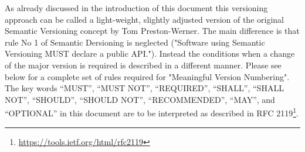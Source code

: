 \documentclass[10pt,a4paper]{article}
\begin{document}
As already discussed in the introduction of this document this versioning approach can be called a light-weight, slightly adjusted version of the original Semantic Versioning concept by Tom Preston-Werner. The main difference is that rule No 1 of Semantic Dersioning is neglected ("Software using Semantic Versioning MUST declare a public API."). Instead the conditions when a change of the major version is required is described in a different manner. Please see below for a complete set of rules required for "Meaningful Version Numbering".
\\

The key words “MUST”, “MUST NOT”, “REQUIRED”, “SHALL”, “SHALL NOT”, “SHOULD”, “SHOULD NOT”, “RECOMMENDED”, “MAY”, and “OPTIONAL” in this document are to be interpreted as described in RFC 2119\footnote{\url{https://tools.ietf.org/html/rfc2119}}.
\end{document}

